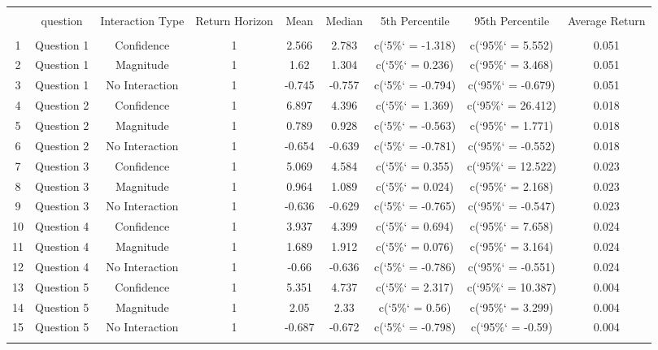 
\begin{table}[!htbp] \centering 
  \caption{} 
  \label{} 
\begin{tabular}{@{\extracolsep{5pt}} ccccccccc} 
\\[-1.8ex]\hline 
\hline \\[-1.8ex] 
 & question & Interaction Type & Return Horizon & Mean & Median & 5th Percentile & 95th Percentile & Average Return \\ 
\hline \\[-1.8ex] 
1 & Question 1 & Confidence & 1 & 2.566 & 2.783 & c(`5\%` = -1.318) & c(`95\%` = 5.552) & 0.051 \\ 
2 & Question 1 & Magnitude & 1 & 1.62 & 1.304 & c(`5\%` = 0.236) & c(`95\%` = 3.468) & 0.051 \\ 
3 & Question 1 & No Interaction & 1 & -0.745 & -0.757 & c(`5\%` = -0.794) & c(`95\%` = -0.679) & 0.051 \\ 
4 & Question 2 & Confidence & 1 & 6.897 & 4.396 & c(`5\%` = 1.369) & c(`95\%` = 26.412) & 0.018 \\ 
5 & Question 2 & Magnitude & 1 & 0.789 & 0.928 & c(`5\%` = -0.563) & c(`95\%` = 1.771) & 0.018 \\ 
6 & Question 2 & No Interaction & 1 & -0.654 & -0.639 & c(`5\%` = -0.781) & c(`95\%` = -0.552) & 0.018 \\ 
7 & Question 3 & Confidence & 1 & 5.069 & 4.584 & c(`5\%` = 0.355) & c(`95\%` = 12.522) & 0.023 \\ 
8 & Question 3 & Magnitude & 1 & 0.964 & 1.089 & c(`5\%` = 0.024) & c(`95\%` = 2.168) & 0.023 \\ 
9 & Question 3 & No Interaction & 1 & -0.636 & -0.629 & c(`5\%` = -0.765) & c(`95\%` = -0.547) & 0.023 \\ 
10 & Question 4 & Confidence & 1 & 3.937 & 4.399 & c(`5\%` = 0.694) & c(`95\%` = 7.658) & 0.024 \\ 
11 & Question 4 & Magnitude & 1 & 1.689 & 1.912 & c(`5\%` = 0.076) & c(`95\%` = 3.164) & 0.024 \\ 
12 & Question 4 & No Interaction & 1 & -0.66 & -0.636 & c(`5\%` = -0.786) & c(`95\%` = -0.551) & 0.024 \\ 
13 & Question 5 & Confidence & 1 & 5.351 & 4.737 & c(`5\%` = 2.317) & c(`95\%` = 10.387) & 0.004 \\ 
14 & Question 5 & Magnitude & 1 & 2.05 & 2.33 & c(`5\%` = 0.56) & c(`95\%` = 3.299) & 0.004 \\ 
15 & Question 5 & No Interaction & 1 & -0.687 & -0.672 & c(`5\%` = -0.798) & c(`95\%` = -0.59) & 0.004 \\ 
\hline \\[-1.8ex] 
\end{tabular} 
\end{table} 
